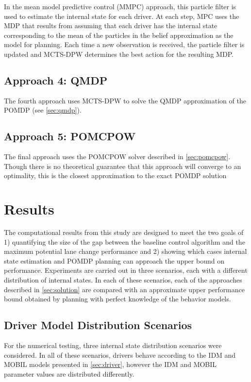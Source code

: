 In the mean model predictive control (MMPC) approach, this particle filter is used to estimate the internal state for each driver. At each step, MPC uses the MDP that results from assuming that each driver has the internal state corresponding to the mean of the particles in the belief approximation as the model for planning. Each time a new observation is received, the particle filter is updated and MCTS-DPW determines the best action for the resulting MDP.

\subsection{Approach 4: QMDP}

The fourth approach uses MCTS-DPW to solve the QMDP approximation of the POMDP (see \cref{sec:qmdp}).

\subsection{Approach 5: POMCPOW}

The final approach uses the POMCPOW solver described in \cref{sec:pomcpow}.
Though there is no theoretical guarantee that this approach will converge to an optimality, this is the closest approximation to the exact POMDP solution

\section{Results}

The computational results from this study are designed to meet the two goals of 1) quantifying the size of the gap between the baseline control algorithm and the maximum potential lane change performance and 2) showing which cases internal state estimation and POMDP planning can approach the upper bound on performance.
Experiments are carried out in three scenarios, each with a different distribution of internal states.
In each of these scenarios, each of the approaches described in \cref{sec:solution} are compared with an approximate upper performance bound obtained by planning with perfect knowledge of the behavior models.

\subsection{Driver Model Distribution Scenarios} \label{sec:dist}

For the numerical testing, three internal state distribution scenarios were considered.
In all of these scenarios, drivers behave according to the IDM and MOBIL models presented in \cref{sec:driver}, however the IDM and MOBIL parameter values are distributed differently.

